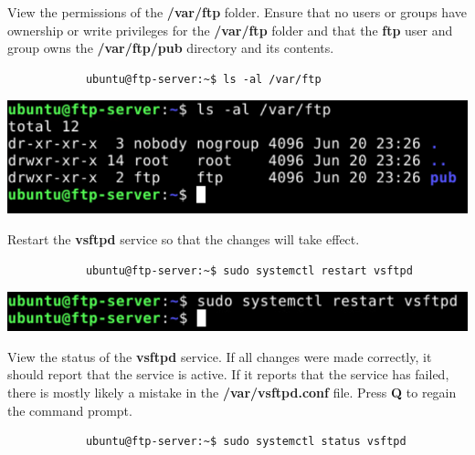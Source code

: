 \documentclass[letterpaper, 12pt]{article}
\begin{document}
\begin{enumerate}
    \begin{labstep}
        View the permissions of the \textbf{/var/ftp} folder.
        Ensure that no users or groups have ownership or write privileges for the \textbf{/var/ftp} folder and that the \textbf{ftp} user and group owns the \textbf{/var/ftp/pub} directory and its contents.
        \begin{lstlisting}
            ubuntu@ftp-server:~$ ls -al /var/ftp
        \end{lstlisting}

        \begin{center}
            \includegraphics[width=\linewidth]{images/part2/step14.png}
        \end{center}
    \end{labstep}

    \begin{labstep}
        Restart the \textbf{vsftpd} service so that the changes will take effect.
        \begin{lstlisting}
            ubuntu@ftp-server:~$ sudo systemctl restart vsftpd
        \end{lstlisting}

        \begin{center}
            \includegraphics[width=\linewidth]{images/part2/step15.png}
        \end{center}
    \end{labstep}

    \begin{labstep}
        View the status of the \textbf{vsftpd} service.
        If all changes were made correctly, it should report that the service is active.
        If it reports that the service has failed, there is mostly likely a mistake in the \textbf{/var/vsftpd.conf} file.
        Press \textbf{Q} to regain the command prompt.
        \begin{lstlisting}
            ubuntu@ftp-server:~$ sudo systemctl status vsftpd
        \end{lstlisting}


\end{labstep}
\end{enumerate}
\end{document}

